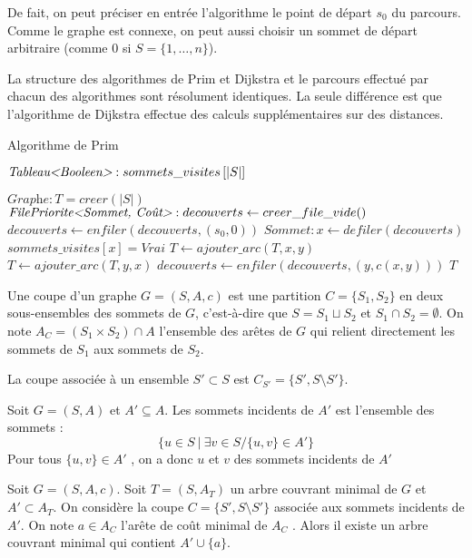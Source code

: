 \documentclass[../../../main.tex]{subfiles}
\begin{document}
De fait, on peut préciser en entrée l'algorithme le point de départ $s_0$ du parcours. Comme le graphe
est connexe, on peut aussi choisir un sommet de départ arbitraire (comme $0$ si $S = \{1, \dots, n\}$).

La structure des algorithmes de Prim et Dijkstra et le parcours effectué par chacun des algorithmes
sont résolument identiques. La seule différence est que l'algorithme de Dijkstra effectue des calculs supplémentaires sur
des distances.

\begin{algorithm}
\caption{Algorithme de Prim\label{alg:prim}}
$\textit{Tableau\textless Booleen\textgreater }:sommets\_visites\left[|S|\right]$\;

$\textit{Graphe}:T = creer(|S|)$\;
$\textit{FilePriorite\textless Sommet, Coût\textgreater }:decouverts\leftarrow creer\_file\_vide()$
$decouverts \leftarrow enfiler(decouverts, (s_0, 0))$\;
 {
	$Sommet:x\leftarrow defiler(decouverts)$
	 {
		$sommets\_visites[x] = \textit{Vrai}$\;
		$T\leftarrow ajouter\_arc(T, x, y)$\;
		$T\leftarrow ajouter\_arc(T, y, x)$\;
		 {
			$decouverts\leftarrow enfiler(decouverts, (y, c(x, y)))$\;
		}
	}
}
\Return $T$\;
\end{algorithm}

 {
	Une coupe d'un graphe $G = (S, A, c)$ est une partition $C = \{S_1, S_2\}$ en deux sous-ensembles
des sommets de $G$, c'est-à-dire que $S = S_1 \sqcup S_2$ et $S_1\cap S_2 = \emptyset$.\newline
On note $A_C = (S_1\times S_2 )\cap A$ l'ensemble des arêtes de $G$ qui relient directement les sommets de
$S_1$ aux sommets de $S_2$.\newline

La coupe associée à un ensemble $S'\subset S$ est $C_{S'} = \{S', S\setminus S'\}$.
}
 {
	Soit $G = (S, A)$ et $A' \subseteq A$. Les sommets incidents de $A'$ est l'ensemble des sommets :
$$\{u \in S\ |\ \exists v \in S/\{u, v\}\in A'\}$$
Pour tous $\{u, v\}\in A'$ , on a donc $u$ et $v$ des sommets incidents de $A'$
}

 Soit $G = (S, A, c)$.
Soit $T = (S, A_T)$ un arbre couvrant minimal de $G$ et $A'\subset A_T$. On considère la coupe $C = \{S', S \setminus S'\}$
associée aux sommets incidents de $A'$. On note $a\in A_C$ l’arête de coût minimal de $A_C$ . Alors il existe
un arbre couvrant minimal qui contient $A'\cup \{a\}$.
\end{document}
